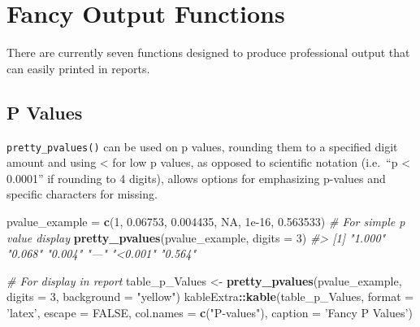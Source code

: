 \documentclass[table]{article}
\newenvironment{Shaded}{\begin{snugshade}}{\end{snugshade}}
\newcommand{\CommentTok}[1]{\textcolor[rgb]{0.56,0.35,0.01}{\textit{#1}}}
\newcommand{\DataTypeTok}[1]{\textcolor[rgb]{0.13,0.29,0.53}{#1}}
\newcommand{\DecValTok}[1]{\textcolor[rgb]{0.00,0.00,0.81}{#1}}
\newcommand{\FloatTok}[1]{\textcolor[rgb]{0.00,0.00,0.81}{#1}}
\newcommand{\KeywordTok}[1]{\textcolor[rgb]{0.13,0.29,0.53}{\textbf{#1}}}
\newcommand{\NormalTok}[1]{#1}
\newcommand{\OperatorTok}[1]{\textcolor[rgb]{0.81,0.36,0.00}{\textbf{#1}}}
\newcommand{\OtherTok}[1]{\textcolor[rgb]{0.56,0.35,0.01}{#1}}
\newcommand{\StringTok}[1]{\textcolor[rgb]{0.31,0.60,0.02}{#1}}
\begin{document}
\begin{Shaded}
\end{Shaded}

\hypertarget{fancy-output-functions}{%
\section{Fancy Output Functions}\label{fancy-output-functions}}

There are currently seven functions designed to produce professional
output that can easily printed in reports.

\hypertarget{p-values}{%
\subsection{P Values}\label{p-values}}

\texttt{pretty\_pvalues()} can be used on p values, rounding them to a
specified digit amount and using \textless{} for low p values, as
opposed to scientific notation (i.e.~``p \textless{} 0.0001'' if
rounding to 4 digits), allows options for emphasizing p-values and
specific characters for missing.

\begin{Shaded}
\begin{Highlighting}[]
\NormalTok{pvalue_example =}\StringTok{ }\KeywordTok{c}\NormalTok{(}\DecValTok{1}\NormalTok{, }\FloatTok{0.06753}\NormalTok{, }\FloatTok{0.004435}\NormalTok{, }\OtherTok{NA}\NormalTok{, }\FloatTok{1e-16}\NormalTok{, }\FloatTok{0.563533}\NormalTok{)}
\CommentTok{# For simple p value display}
\KeywordTok{pretty_pvalues}\NormalTok{(pvalue_example, }\DataTypeTok{digits =} \DecValTok{3}\NormalTok{)}
\CommentTok{#> [1] "1.000"  "0.068"  "0.004"  "---"    "<0.001" "0.564"}

\CommentTok{# For display in report}
\NormalTok{table_p_Values <-}\StringTok{ }\KeywordTok{pretty_pvalues}\NormalTok{(pvalue_example, }\DataTypeTok{digits =} \DecValTok{3}\NormalTok{, }\DataTypeTok{background =} \StringTok{"yellow"}\NormalTok{)}
\NormalTok{kableExtra}\OperatorTok{::}\KeywordTok{kable}\NormalTok{(table_p_Values, }\DataTypeTok{format =} \StringTok{'latex'}\NormalTok{, }\DataTypeTok{escape =} \OtherTok{FALSE}\NormalTok{, }
                  \DataTypeTok{col.names =} \KeywordTok{c}\NormalTok{(}\StringTok{"P-values"}\NormalTok{), }\DataTypeTok{caption =} \StringTok{'Fancy P Values'}\NormalTok{)}
\end{Highlighting}
\end{Shaded}
\end{document}
